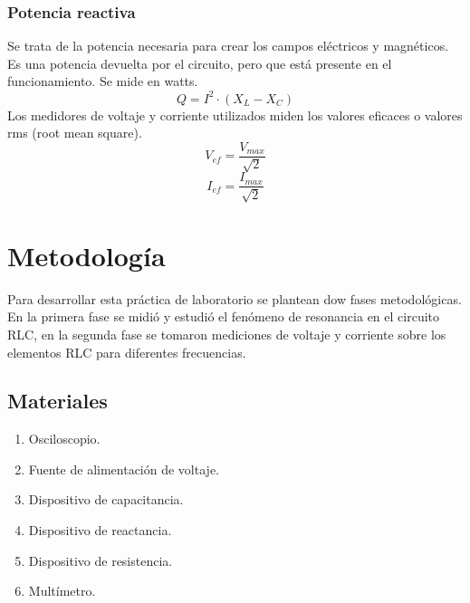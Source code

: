 \documentclass[spanish,notitlepage,letterpaper, 12pt]{article}
\begin{document}
\subsubsection{Potencia reactiva}
Se trata de la potencia necesaria para crear los campos eléctricos y magnéticos. Es una
potencia devuelta por el circuito, pero que está presente en el funcionamiento.
Se mide en watts.
\begin{equation}
    Q=I^2\cdot(X_L-X_C)
\end{equation}
Los medidores de voltaje y corriente utilizados miden los valores eficaces o valores rms (root mean square).
\begin{equation}
    V_{ef}=\frac{V_{max}}{\sqrt{2}}
\end{equation}
\begin{equation}
    I_{ef}=\frac{I_{max}}{\sqrt{2}}
\end{equation}
\section{Metodología}
Para desarrollar esta práctica de laboratorio se plantean dow fases
metodológicas. En la primera fase se midió y estudió el fenómeno de
resonancia en el circuito RLC, en la segunda fase se tomaron mediciones de
voltaje y corriente sobre los elementos RLC para diferentes frecuencias.
\subsection{Materiales}
\begin{enumerate}
    \item Osciloscopio.
    \item Fuente de alimentación de voltaje.
    \item Dispositivo de capacitancia.
    \item Dispositivo de reactancia.
    \item Dispositivo de resistencia.
    \item Multímetro.
\end{enumerate}
\end{document}
